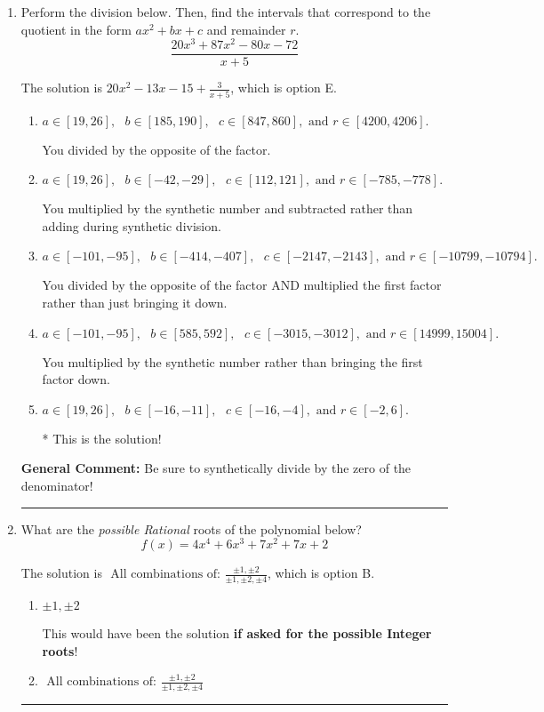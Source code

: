 \documentclass{extbook}[14pt]
\newcommand{\litem}[1]{\item #1

\rule{\textwidth}{0.4pt}}
\begin{document}
\begin{enumerate}\litem{
Perform the division below. Then, find the intervals that correspond to the quotient in the form $ax^2+bx+c$ and remainder $r$.
\[ \frac{20x^{3} +87 x^{2} -80 x -72}{x + 5} \]

The solution is \( 20x^{2} -13 x -15 + \frac{3}{x + 5} \), which is option E.\begin{enumerate}[label=\Alph*.]
\item \( a \in [19, 26], \text{   } b \in [185, 190], \text{   } c \in [847, 860], \text{   and   } r \in [4200, 4206]. \)

 You divided by the opposite of the factor.
\item \( a \in [19, 26], \text{   } b \in [-42, -29], \text{   } c \in [112, 121], \text{   and   } r \in [-785, -778]. \)

 You multiplied by the synthetic number and subtracted rather than adding during synthetic division.
\item \( a \in [-101, -95], \text{   } b \in [-414, -407], \text{   } c \in [-2147, -2143], \text{   and   } r \in [-10799, -10794]. \)

 You divided by the opposite of the factor AND multiplied the first factor rather than just bringing it down.
\item \( a \in [-101, -95], \text{   } b \in [585, 592], \text{   } c \in [-3015, -3012], \text{   and   } r \in [14999, 15004]. \)

 You multiplied by the synthetic number rather than bringing the first factor down.
\item \( a \in [19, 26], \text{   } b \in [-16, -11], \text{   } c \in [-16, -4], \text{   and   } r \in [-2, 6]. \)

* This is the solution!
\end{enumerate}

\textbf{General Comment:} Be sure to synthetically divide by the zero of the denominator!
}
\litem{
What are the \textit{possible Rational} roots of the polynomial below?
\[ f(x) = 4x^{4} +6 x^{3} +7 x^{2} +7 x + 2 \]

The solution is \( \text{ All combinations of: }\frac{\pm 1,\pm 2}{\pm 1,\pm 2,\pm 4} \), which is option B.\begin{enumerate}[label=\Alph*.]
\item \( \pm 1,\pm 2 \)

This would have been the solution \textbf{if asked for the possible Integer roots}!
\item \( \text{ All combinations of: }\frac{\pm 1,\pm 2}{\pm 1,\pm 2,\pm 4} \)


\end{enumerate}}
\end{enumerate}
\end{document}
